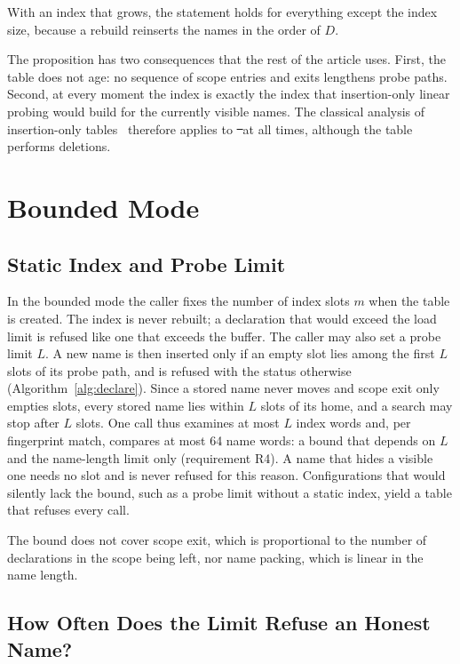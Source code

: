 With an index that grows, the statement holds for everything except the index size, because a rebuild reinserts the names in the order of $D$.

The proposition has two consequences that the rest of the article uses. First, the table does not age: no sequence of scope entries and exits lengthens probe paths. Second, at every moment the index is exactly the index that insertion-only linear probing would build for the currently visible names. The classical analysis of insertion-only tables~\cite{knuth3} therefore applies to \st\ at all times, although the table performs deletions.

\section{Bounded Mode}
\label{sec:bounded}

\subsection{Static Index and Probe Limit}
In the bounded mode the caller fixes the number of index slots $m$ when the table is created. The index is never rebuilt; a declaration that would exceed the load limit is refused like one that exceeds the buffer. The caller may also set a probe limit $L$. A new name is then inserted only if an empty slot lies among the first $L$ slots of its probe path, and is refused with the status  otherwise (Algorithm~\ref{alg:declare}). Since a stored name never moves and scope exit only empties slots, every stored name lies within $L$ slots of its home, and a search may stop after $L$ slots. One call thus examines at most $L$ index words and, per fingerprint match, compares at most 64 name words: a bound that depends on $L$ and the name-length limit only (requirement R4). A name that hides a visible one needs no slot and is never refused for this reason. Configurations that would silently lack the bound, such as a probe limit without a static index, yield a table that refuses every call.

The bound does not cover scope exit, which is proportional to the number of declarations in the scope being left, nor name packing, which is linear in the name length.

\subsection{How Often Does the Limit Refuse an Honest Name?}
\label{sec:bound}

